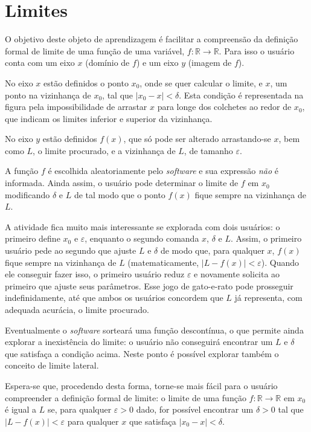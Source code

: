 \documentclass{article}
\newcommand\foreign[1]{\textsl{#1}}
\begin{document}
\section*{Limites}

O objetivo deste objeto de aprendizagem é facilitar a compreensão da definição formal de limite de uma função de uma variável, $f : \mathbb{R} \to \mathbb{R}$. Para isso o usuário conta com um eixo $x$ (domínio de $f$) e um eixo $y$ (imagem de $f$).

No eixo $x$ estão definidos o ponto $x_0$, onde se quer calcular o limite, e $x$, um ponto na vizinhança de $x_0$, tal que $|x_0 - x| < \delta$. Esta condição é representada na figura pela impossibilidade de arrastar $x$ para longe dos colchetes ao redor de $x_0$, que indicam os limites inferior e superior da vizinhança.

No eixo $y$ estão definidos $f(x)$, que só pode ser alterado arrastando-se $x$, bem como $L$, o limite procurado, e a vizinhança de $L$, de tamanho $\varepsilon$.

A função $f$ é escolhida aleatoriamente pelo \foreign{software} e sua expressão \emph{não} é informada. Ainda assim, o usuário pode determinar o limite de $f$ em $x_0$ modificando $\delta$ e $L$ de tal modo que o ponto $f(x)$ fique sempre na vizinhança de $L$.

A atividade fica muito mais interessante se explorada com dois usuários: o primeiro define $x_0$ e $\varepsilon$, enquanto o segundo comanda $x$, $\delta$ e $L$. Assim, o primeiro usuário pede ao segundo que ajuste $L$ e $\delta$ de modo que, para qualquer $x$, $f(x)$ fique sempre na vizinhança de $L$ (matematicamente, $|L - f(x)| < \varepsilon$). Quando ele conseguir fazer isso, o primeiro usuário reduz $\varepsilon$ e novamente solicita ao primeiro que ajuste seus parâmetros. Esse jogo de gato-e-rato pode prosseguir indefinidamente, até que ambos os usuários concordem que $L$ já representa, com adequada acurácia, o limite procurado.

Eventualmente o \foreign{software} sorteará uma função descontínua, o que permite ainda explorar a inexistência do limite: o usuário não conseguirá encontrar um $L$ e $\delta$ que satisfaça a condição acima. Neste ponto é possível explorar também o conceito de limite lateral.

Espera-se que, procedendo desta forma, torne-se mais fácil para o usuário compreender a definição formal de limite: o limite de uma função $f : \mathbb{R} \to \mathbb{R}$ em $x_0$ é igual a $L$ se, para qualquer $\varepsilon > 0$ dado, for possível encontrar um $\delta > 0$ tal que $|L - f(x)| < \varepsilon$ para qualquer $x$ que satisfaça $|x_0 - x| < \delta$.
\end{document}
